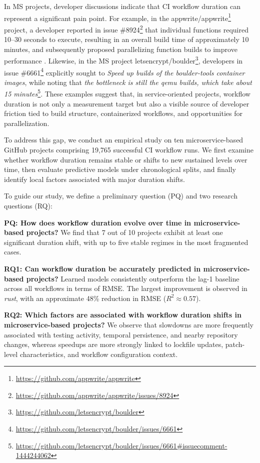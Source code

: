 \documentclass[conference]{IEEEconf}
\begin{document}
In MS projects, developer discussions indicate that CI workflow duration can represent a significant pain point. For example, in the appwrite/appwrite\footnote{\url{https://github.com/appwrite/appwrite}} project, a developer reported in issue \#8924\footnote{\url{https://github.com/appwrite/appwrite/issues/8924}} that individual functions required 10--30 seconds to execute, resulting in an overall build time of approximately 10 minutes, and subsequently proposed parallelizing function builds to improve performance \cite{appwriteParallelBuilds}. Likewise, in the MS project letsencrypt/boulder\footnote{\url{https://github.com/letsencrypt/boulder}}, developers in issue \#6661\footnote{\url{https://github.com/letsencrypt/boulder/issues/6661}} explicitly sought to \textit{Speed up builds of the boulder-tools container images}, while noting that \textit{the bottleneck is still the qemu builds, which take about 15 minutes}\footnote{\url{https://github.com/letsencrypt/boulder/issues/6661#issuecomment-1444244062}}. These examples suggest that, in service-oriented projects, workflow duration is not only a measurement target but also a visible source of developer friction tied to build structure, containerized workflows, and opportunities for parallelization.



To address this gap, we conduct an empirical study on ten microservice-based GitHub projects comprising 19,765 successful CI workflow runs. We first examine whether workflow duration remains stable or shifts to new sustained levels over time, then evaluate predictive models under chronological splits, and finally identify local factors associated with major duration shifts.

To guide our study, we define a preliminary question (PQ) and two research questions (RQ):

\noindent\textbf{PQ: How does workflow duration evolve over time in microservice-based projects?} We find that 7 out of 10 projects exhibit at least one significant duration shift, with up to five stable regimes in the most fragmented cases.

\noindent\textbf{RQ1: Can workflow duration be accurately predicted in microservice-based projects?} Learned models consistently outperform the lag-1 baseline across all workflows in terms of RMSE. The largest improvement is observed in \textit{rust}, with an approximate 48\% reduction in RMSE ($R^2 \approx 0.57$).

\noindent\textbf{RQ2: Which factors are associated with workflow duration shifts in microservice-based projects?} We observe that slowdowns are more frequently associated with testing activity, temporal persistence, and nearby repository changes, whereas speedups are more strongly linked to lockfile updates, patch-level characteristics, and workflow configuration context.
\end{document}
